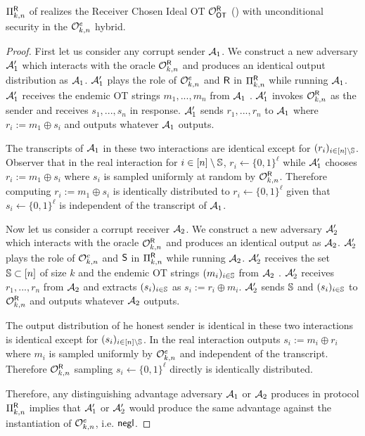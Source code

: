 \begin{lemma}
	$\Pi^{\mathsf{R}}_{k,n}$ of  realizes the Receiver Chosen Ideal OT $\mathcal{O}_{\mathsf{OT}}^{\mathsf{R}}$ () with unconditional security in the $\mathcal{O}^{e}_{k,n}$ hybrid.
\end{lemma}

\begin{proof}
	First let us consider any corrupt sender $\mathcal{A}_1$. We construct a new adversary $\mathcal{A}_1'$ which interacts with the oracle $\mathcal{O}^{\mathsf{R}}_{k,n}$ and produces an identical output distribution as $\mathcal{A}_1$.  $\mathcal{A}_1'$ plays the role of $\mathcal{O}^{e}_{k,n}$ and $\mathsf{R}$ in $\Pi^{\mathsf{R}}_{k,n}$ while running $\mathcal{A}_1$. $\mathcal{A}_1'$ receives the endemic OT strings $m_1,...,m_n$ from $\mathcal{A}_1$%
. $\mathcal{A}_1'$ invokes $\mathcal{O}^{\mathsf{R}}_{k,n}$ as the sender and receives $s_1,...,s_n$ in response. $\mathcal{A}_1'$ sends $r_1,...,r_n$ to $\mathcal{A}_1$ where $r_i:=m_1\oplus s_i$ and 	 outputs whatever $\mathcal{A}_1$ outputs.
	
	The transcripts of $\mathcal{A}_1$ in these two interactions are identical except for $(r_i)_{i\in [n]\setminus \mathsf{\mathbb S}}$. Observer that in the real interaction for $i\in [n]\setminus\mathsf{\mathbb S}$, $r_i\gets\{0,1\}^\ell$ while $\mathcal{A}_1'$ chooses $r_i:=m_1\oplus s_i$ where $s_i$ is sampled uniformly at random by $\mathcal{O}^{\mathsf{R}}_{k,n}$. Therefore computing $r_i:=m_1\oplus s_i$ is identically distributed to $r_i\gets\{0,1\}^\ell$ given that $s_i\gets\{0,1\}^\ell$ is independent of the transcript of $\mathcal{A}_1$. 
	
	
	Now let us consider a corrupt receiver $\mathcal{A}_2$. We construct a new adversary $\mathcal{A}_2'$ which interacts with the oracle $\mathcal{O}^{\mathsf{R}}_{k,n}$ and produces an identical output as $\mathcal{A}_2$. $\mathcal{A}_2'$ plays the role of $\mathcal{O}^{e}_{k,n}$ and $\mathsf{S}$ in $\Pi^{\mathsf{R}}_{k,n}$ while running $\mathcal{A}_2$. $\mathcal{A}_2'$ receives the set $\mathsf{\mathbb S}\subset[n]$ of size $k$ and the endemic OT strings $(m_i)_{i\in \mathsf{\mathbb S}}$ from $\mathcal{A}_2$%
. $\mathcal{A}_2'$ receives $r_1,...,r_n$ from $\mathcal{A}_2$%
 and extracts $(s_i)_{i\in \mathsf{\mathbb S}}$ as $s_i:=r_i\oplus m_i$. $\mathcal{A}_2'$ sends $\mathsf{\mathbb S}$ and $(s_i)_{i\in \mathsf{\mathbb S}}$ to $\mathcal{O}^{\mathsf{R}}_{k,n}$ and outputs whatever $\mathcal{A}_2$ outputs.
	
	The output distribution of he honest sender is identical in these two interactions is identical except for $(s_i)_{i\in [n]\setminus \mathsf{\mathbb S}}$. In the real interaction \send outputs $s_i:=m_i\oplus r_i$ where $m_i$ is sampled uniformly by $\mathcal{O}^{e}_{k,n}$ and independent of the transcript. Therefore $\mathcal{O}^{\mathsf{R}}_{k,n}$ sampling $s_i\gets\{0,1\}^\ell$ directly is identically distributed.
	
	Therefore, any distinguishing advantage adversary $\mathcal{A}_1$ or $\mathcal{A}_2$ produces in protocol $\Pi^{\mathsf{R}}_{k,n}$ implies  that $\mathcal{A}_1'$ or $\mathcal{A}_2'$ would produce the same advantage against the instantiation of $\mathcal{O}^{e}_{k,n}$, i.e. $\mathsf{negl}$.
\end{proof}



